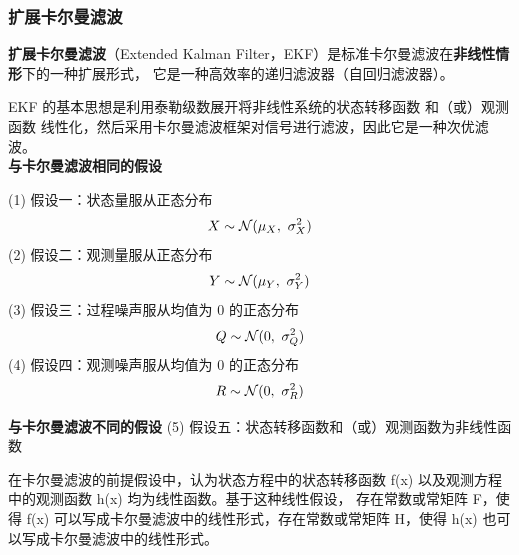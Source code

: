 \documentclass[12pt]{ctexart}
\begin{document}
\subsubsection{扩展卡尔曼滤波}
\textbf{扩展卡尔曼滤波}（Extended Kalman Filter，EKF）是标准卡尔曼滤波在\textbf{非线性情形}下的一种扩展形式，
它是一种高效率的递归滤波器（自回归滤波器）。
\par
EKF 的基本思想是利用泰勒级数展开将非线性系统的状态转移函数 
和（或）观测函数 线性化，然后采用卡尔曼滤波框架对信号进行滤波，因此它是一种次优滤波。
~\\
\textcolor{myblue}{\textbf{与卡尔曼滤波相同的假设}}

(1) 假设一：状态量服从正态分布
\[
X \sim \mathcal{N}(\mu_X, \ \sigma_X^2) \\
\]
(2) 假设二：观测量服从正态分布
\[
Y \sim \mathcal{N}(\mu_Y, \ \sigma_Y^2) \\
\]
(3) 假设三：过程噪声服从均值为 0 的正态分布
\[
Q \sim \mathcal{N}(0, \ \sigma_Q^2) \\
\]
(4) 假设四：观测噪声服从均值为 0 的正态分布
\[
R \sim \mathcal{N}(0, \ \sigma_R^2) \\
\]

\textcolor{myblue}{\textbf{与卡尔曼滤波不同的假设}}
(5) 假设五：状态转移函数和（或）观测函数为非线性函数

在卡尔曼滤波的前提假设中，认为状态方程中的状态转移函数 f(x) 以及观测方程中的观测函数 h(x) 均为线性函数。基于这种线性假设，
存在常数或常矩阵 F，使得 f(x) 可以写成卡尔曼滤波中的线性形式，存在常数或常矩阵 H，使得 h(x) 也可以写成卡尔曼滤波中的线性形式。
\end{document}
